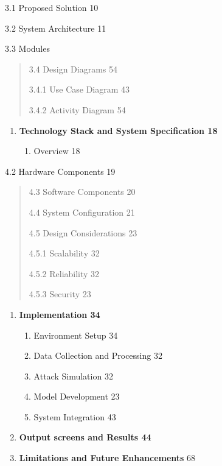 3.1 Proposed Solution 10

3.2 System Architecture 11

3.3 Modules

\begin{quote}
3.4 Design Diagrams 54

3.4.1 Use Case Diagram 43

3.4.2 Activity Diagram 54
\end{quote}

\begin{enumerate}
\def\labelenumi{\arabic{enumi}.}
\setcounter{enumi}{3}
\item
  \textbf{Technology Stack and System Specification 18}

  \begin{enumerate}
  \def\labelenumii{\arabic{enumii}.}
  \item
    Overview 18
  \end{enumerate}
\end{enumerate}

4.2 Hardware Components 19

\begin{quote}
4.3 Software Components 20

4.4 System Configuration 21

4.5 Design Considerations 23

4.5.1 Scalability 32

4.5.2 Reliability 32

4.5.3 Security 23
\end{quote}

\begin{enumerate}
\def\labelenumi{\arabic{enumi}.}
\setcounter{enumi}{4}
\item
  \textbf{Implementation 34}

  \begin{enumerate}
  \def\labelenumii{\arabic{enumii}.}
  \item
    Environment Setup 34
  \item
    Data Collection and Processing 32
  \item
    Attack Simulation 32
  \item
    Model Development 23
  \item
    System Integration 43
  \end{enumerate}
\item
  \textbf{Output screens and Results 44}
\item
  \textbf{Limitations and Future Enhancements} 68
\end{enumerate}

